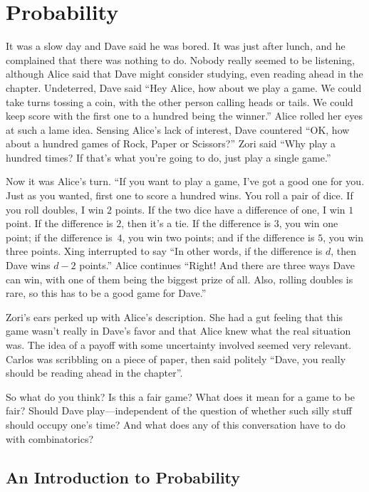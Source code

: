 
\chapter{Probability}\label{ch:probability}

It was a slow day and Dave said he was bored.  It was just after lunch,
and he complained that there was nothing to do.  Nobody really seemed
to be listening, although Alice said that Dave might consider
studying, even reading ahead in the chapter.  Undeterred, Dave said
``Hey Alice, how about we play a game.  We could take turns tossing a
coin, with the other person calling heads or tails.  We could keep
score with the first one to a hundred being the winner.''  Alice
rolled her eyes at such a lame idea.  Sensing Alice's lack of
interest, Dave countered ``OK, how about a hundred games of Rock, Paper
or Scissors?''  Zori said ``Why play a hundred times?  If that's what
you're going to do, just play a single game.''

Now it was Alice's turn.  ``If you want to play a game, I've got a
good one for you.  Just as you wanted, first one to score a hundred
wins.  You roll a pair of dice.  If you roll doubles, I win $2$
points.  If the two dice have a difference of one, I win $1$ point.
If the difference is $2$, then it's a tie.  If the difference is $3$,
you win one point; if the difference is~$4$, you win two points; and if
the difference is $5$, you win three points.  Xing interrupted to say
``In other words, if the difference is $d$, then Dave wins $d-2$
points.''  Alice continues ``Right!  And there are three ways Dave can
win, with one of them being the biggest prize of all.  Also, rolling
doubles is rare, so this has to be a good game for Dave.''

Zori's ears perked up with Alice's description.  She had a gut feeling
that this game wasn't really in Dave's favor and that Alice knew what
the real situation was.  The idea of a payoff with some
uncertainty involved seemed very relevant.  Carlos was scribbling on a piece of paper,
then said politely ``Dave, you really should be reading ahead in the
chapter''.

So what do you think?  Is this a fair game?  What does it mean for a
game to be fair?  Should Dave play---independent of the question of
whether such silly stuff should occupy one's time?  And what does any
of this conversation have to do with combinatorics?

\section{An Introduction to Probability}\label{s:probability:intro}

